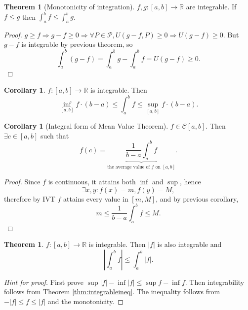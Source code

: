 \documentclass[a4paper]{article}
\theoremstyle{definition}
\newtheorem{thm}[defn]{Theorem}
\newtheorem{coro}[defn]{Corollary}
\begin{document}
\begin{thm}[Monotonicity of integration]
	$f,g:[a,b]\rightarrow \mathbb R$ are integrable. If $f \leq g$ then $\int_a^b f \leq \int_a^b g$.
\end{thm}
\begin{proof}
	$g \geq f \Rightarrow g-f \geq 0 \Rightarrow \forall P \in \mathcal P, U(g-f,P) \geq 0 \Rightarrow U(g-f)\geq 0 $. But $g-f$ is integrable by previous theorem, so
\[
\int_a^b (g-f) = \int_a^b g-\int_a^b f = U(g-f) \geq 0 .
\]
\end{proof}

\begin{coro}
	$f:[a,b]\rightarrow \mathbb R$ is integrable. Then
\[
\underset{[a,b]}{\inf} f \cdot (b-a) \leq \int_a^b f \leq \underset{[a,b]}{\sup} f \cdot (b-a) .
\]
\end{coro}

\begin{coro}[Integral form of Mean Value Theorem]
	$f\in \mathcal C [a,b]$. Then $\exists c\in [a,b]$ such that
\[
f(c)=\underbrace{\frac{1}{b-a} \int_a^b f}_{\text{the average value of }f\text{ on }[a,b]} .
\]
\end{coro}
\begin{proof}
	Since $f$ is continuous, it attains both $\inf$ and $\sup$, hence
\[
\exists x,y : f(x)=m,f(y)=M,
\]
therefore by IVT $f$ attains every value in $[m,M]$, and by previous corollary,
\[
m\leq \frac1{b-a}\int_a^b f \leq M.
\]
\end{proof}

\begin{thm}
	$f:[a,b]\rightarrow \mathbb R$ is integrable. Then $|f|$ is also integrable and
\[
\left|\int_a^b f \right| \leq \int_a^b |f| .
\]
\end{thm}
\begin{proof}[Hint for proof]
	First prove $\sup |f| - \inf |f| \leq \sup f - \inf f$. Then integrability follows from Theorem \ref{thm:integrableineq}. The inequality follows from $-|f| \leq f \leq |f|$ and the monotonicity.
\end{proof}
\end{document}
